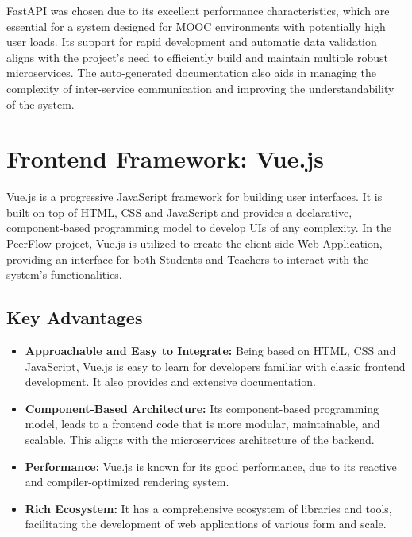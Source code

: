 \begin{justify}
FastAPI was chosen due to its excellent performance characteristics, which are essential for a system designed for MOOC environments with potentially high user loads. Its support for rapid development and automatic data validation aligns with the project's need to efficiently build and maintain multiple robust microservices. The auto-generated documentation also aids in managing the complexity of inter-service communication and improving the understandability of the system.
\end{justify}

\section{Frontend Framework: Vue.js}

\begin{justify}
Vue.js is a progressive JavaScript framework for building user interfaces. It is built on top of HTML, CSS and JavaScript and provides a declarative, component-based programming model to develop UIs of any complexity. In the PeerFlow project, Vue.js is utilized to create the client-side Web Application, providing an interface for both Students and Teachers to interact with the system's functionalities.
\end{justify}

\subsection{Key Advantages}

\begin{itemize}
\item \textbf{Approachable and Easy to Integrate:} Being based on HTML, CSS and JavaScript, Vue.js is easy to learn for developers familiar with classic frontend development. It also provides and extensive documentation.
\item \textbf{Component-Based Architecture:} Its component-based programming model, leads to a frontend code that is more modular, maintainable, and scalable. This aligns with the microservices architecture of the backend.
\item \textbf{Performance:} Vue.js is known for its good performance, due to its reactive and compiler-optimized rendering system.
\item \textbf{Rich Ecosystem:} It has a comprehensive ecosystem of libraries and tools, facilitating the development of web applications of various form and scale.
\end{itemize}

